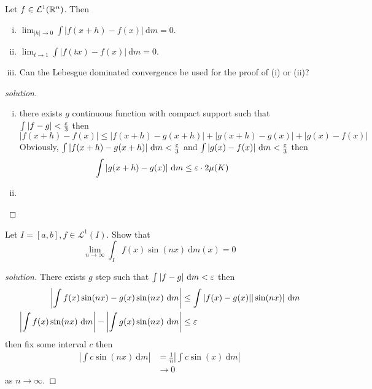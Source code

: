 \begin{problem}
  Let $f \in \mathcal{L}^1(\mathbb R^n)$. Then
  \begin{enumerate}[(i)]
    \item $\lim_{|h| \to 0} \int |f(x+h) - f(x)|\ \mathrm{d}m = 0$.
    \item $\lim_{t \to 1} \int |f(tx) - f(x)|\ \mathrm{d}m = 0$.
    \item Can the Lebesgue dominated convergence be used for the proof of (i) or (ii)?
  \end{enumerate}
\end{problem}

\begin{proof}[solution]
\begin{enumerate}[(i)]
  \item there exists $g$ continuous function with compact support such that $\int |f-g| < \frac{\varepsilon}3$ then
  \[|f(x+h) - f(x)| \le |f(x+h) - g(x+h)| + |g(x+h) - g(x)| + |g(x) - f(x)|\]
  Obviously, $\int |f(x+h) - g(x+h)| \ \mathrm{d}m < \frac\eps3$ and $\int |g(x) - f(x)| \ \mathrm{d}m < \frac{\varepsilon}3$ then
  \begin{align*}
    \int |g(x+h) - g(x)| \ \mathrm{d}m &\le \varepsilon \cdot 2\mu(K)
  \end{align*}
  \item 
\end{enumerate}
\end{proof}

\begin{problem}
  Let $I = [a, b], f \in \mathcal{L}^1(I)$. Show that
  \[\lim_{n\to\infty} \int_I f(x)\sin(nx)\ \mathrm{d}m(x) = 0\]
\end{problem}

\begin{proof}[solution]
  There exists $g$ step such that $\int |f-g| \ \mathrm{d}m < \varepsilon$ then 
  \begin{align*}
    \left|\int f(x)\sin(nx) - g(x)\sin(nx) \ \mathrm{d}m\right| &\le \int |f(x) - g(x)||\sin(nx)|\ \mathrm{d}m\\ 
    \left|\int f(x)\sin(nx)\ \mathrm{d}m\right|- \left|\int g(x)\sin(nx) \ \mathrm{d}m\right|&\le \varepsilon
  \end{align*}
  then fix some interval $c$ then 
  \begin{align*}
    \left|\int c\sin(nx) \ \mathrm{d}m\right| &= \frac1n\left|\int c\sin(x) \ \mathrm{d}m\right|\\
    &\to 0
  \end{align*}
  as $n \to \infty$.
\end{proof}

